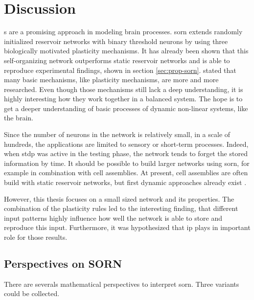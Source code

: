 \section{Discussion}

s are a promising approach in modeling brain processes. \acs{sorn} extends randomly initialized reservoir networks with binary threshold neurons by using three biologically motivated plasticity mechanisms. It has already been shown that this self-organizing network outperforms static reservoir networks and is able to reproduce experimental findings, shown in section \ref{sec:prop-sorn}. \textcite{lazar2009sorn} stated that many basic mechanisms, like plasticity mechanisms, are more and more researched. Even though those mechanisms still lack a deep understanding, it is highly interesting how they work together in a balanced system. The hope is to get a deeper understanding of basic processes of dynamic non-linear systems, like the brain. 

Since the number of neurons in the network is relatively small, in a scale of hundreds, the applications are limited to sensory or short-term processes. Indeed, when \acl{stdp} was active in the testing phase, the network tends to forget the stored information by time. It should be possible to build larger networks using \acs{sorn}, for example in combination with cell assemblies. At present, cell assemblies are often build with static reservoir networks, but first dynamic approaches already exist \parencite{dasgupta2015self, tetzlaff2015use}.

However, this thesis focuses on a small sized network and its properties. The combination of the plasticity rules led to the interesting finding, that different input patterns highly influence how well the network is able to store and reproduce this input. Furthermore, it was hypothesized that \acl{ip} plays in important role for those results.

\subsection{Perspectives on SORN}

There are severals mathematical perspectives to interpret \acs{sorn}. Three variants could be collected.

